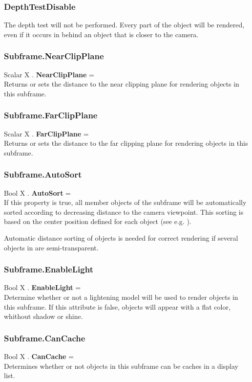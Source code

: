 \subsubsection{DepthTestDisable \label{T:DepthTest|DepthTestDisable}}
The depth test will not be performed. Every part of the object will be rendered, even if it occurs in behind an object that is closer to the camera.

\subsubsection{Subframe.NearClipPlane \label{F:Subframe:NearClipPlane}}
Scalar X . \textbf{NearClipPlane} = \\
Returns or sets the distance to the near clipping plane for rendering objects in this subframe.

\subsubsection{Subframe.FarClipPlane \label{F:Subframe:FarClipPlane}}
Scalar X . \textbf{FarClipPlane} = \\
Returns or sets the distance to the far clipping plane for rendering objects in this subframe.

\subsubsection{Subframe.AutoSort \label{F:Subframe:AutoSort}}
Bool X . \textbf{AutoSort} = \\
If this property is true, all member objects of the subframe will be automatically sorted according to decreasing distance to the camera viewpoint. This sorting is based on the center position defined for each object (see e.g. ).

Automatic distance sorting of objects is needed for correct rendering if several objects in are semi-transparent.

\subsubsection{Subframe.EnableLight \label{F:Subframe:EnableLight}}
Bool X . \textbf{EnableLight} = \\
Determine whether or not a lightening model will be used to render objects in this subframe. If this attribute is false, objects will appear with a flat color, whithout shadow or shine.

\subsubsection{Subframe.CanCache \label{F:Subframe:CanCache}}
Bool X . \textbf{CanCache} = \\
Determines whether or not objects in this subframe can be caches in a display list.

